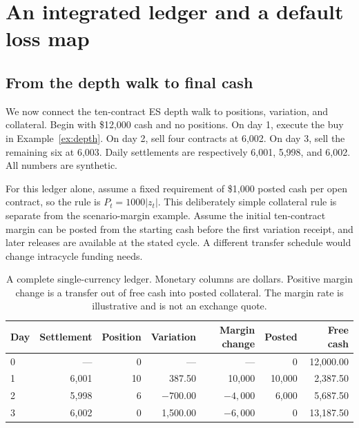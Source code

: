 \section{An integrated ledger and a default loss map}
\label{sec:ledger}

\subsection{From the depth walk to final cash}

We now connect the ten-contract ES depth walk to positions, variation, and collateral. Begin with \$12,000 cash and no positions. On day 1, execute the buy in Example~\ref{ex:depth}. On day 2, sell four contracts at 6,002. On day 3, sell the remaining six at 6,003. Daily settlements are respectively 6,001, 5,998, and 6,002. All numbers are synthetic.

For this ledger alone, assume a fixed requirement of \$1,000 posted cash per open contract, so the rule is $P_t=1000|z_t|$. This deliberately simple collateral rule is separate from the scenario-margin example. Assume the initial ten-contract margin can be posted from the starting cash before the first variation receipt, and later releases are available at the stated cycle. A different transfer schedule would change intracycle funding needs.

\begin{table}[htbp]
\centering\small
\begin{tabular}{@{}lrrrrrr@{}}
\toprule
Day & Settlement & Position & Variation & Margin change & Posted & Free cash\\
\midrule
0 & --- & 0 & --- & --- & 0 & 12,000.00\\
1 & 6,001 & 10 & 387.50 & 10,000 & 10,000 & 2,387.50\\
2 & 5,998 & 6 & $-700.00$ & $-4,000$ & 6,000 & 5,687.50\\
3 & 6,002 & 0 & 1,500.00 & $-6,000$ & 0 & 13,187.50\\
\bottomrule
\end{tabular}
\caption{A complete single-currency ledger. Monetary columns are dollars. Positive margin change is a transfer out of free cash into posted collateral. The margin rate is illustrative and is not an exchange quote.}
\label{tab:ledger}
\end{table}

